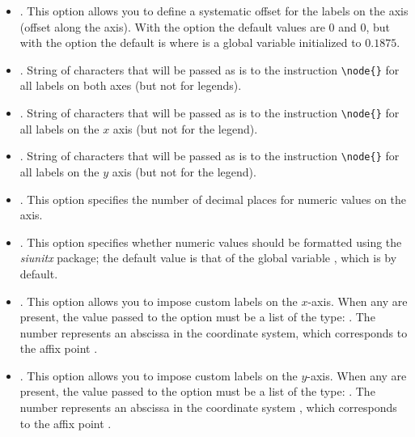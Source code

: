 \begin{itemize}
\begin{itemize}
        \item {}. This option allows you to define a systematic offset for the labels on the axis (offset along the axis). With the option  the default values ​​are $0$ and $0$, but with the option  the default is  where  is a global variable initialized to $0.1875$.
        
        \item {}. String of characters that will be passed as is to the instruction \verb|\node{}| for all labels on both axes (but not for legends).
        
        \item {}. String of characters that will be passed as is to the instruction \verb|\node{}| for all labels on the $x$ axis (but not for the legend).
        
        \item {}. String of characters that will be passed as is to the instruction \verb|\node{}| for all labels on the $y$ axis (but not for the legend).
        
        \item {}. This option specifies the number of decimal places for numeric values ​​on the axis.
        
         \item {}. This option specifies whether numeric values ​​should be formatted using the \emph{siunitx} package; the default value is that of the global variable , which is \false by default.
         
        \item {}. This option allows you to impose custom labels on the $x$-axis. When any are present, the value passed to the option must be a list of the type: . The number  represents an abscissa in the  coordinate system, which corresponds to the affix point .

        \item {}. This option allows you to impose custom labels on the $y$-axis. When any are present, the value passed to the option must be a list of the type: . The number  represents an abscissa in the coordinate system , which corresponds to the affix point .
        

\end{itemize}
\end{itemize}
